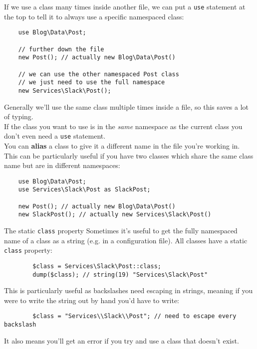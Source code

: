 \pagebreak

If we use a class many times inside another file, we can put a \texttt{use} statement at the top to tell it to always use a specific namespaced class:

\begin{verbatim}
    use Blog\Data\Post;

    // further down the file
    new Post(); // actually new Blog\Data\Post()

    // we can use the other namespaced Post class
    // we just need to use the full namespace
    new Services\Slack\Post();
\end{verbatim}

Generally we'll use the same class multiple times inside a file, so this saves a lot of typing.
\\

If the class you want to use is in the \textit{same} namespace as the current class you don't even need a \texttt{use} statement.
\\

You can \textbf{alias} a class to give it a different name in the file you're working in. This can be particularly useful if you have two classes which share the same class name but are in different namespaces:

\begin{verbatim}
    use Blog\Data\Post;
    use Services\Slack\Post as SlackPost;

    new Post(); // actually new Blog\Data\Post()
    new SlackPost(); // actually new Services\Slack\Post()
\end{verbatim}


\pagebreak

\begin{infobox}{The static \texttt{class} property}
    Sometimes it's useful to get the fully namespaced name of a class as a string (e.g. in a configuration file). All classes have a static \texttt{class} property:

    \begin{verbatim}
        $class = Services\Slack\Post::class;
        dump($class); // string(19) "Services\Slack\Post"
    \end{verbatim}

    This is particularly useful as backslashes need escaping in strings, meaning if you were to write the string out by hand you'd have to write:

    \begin{verbatim}
        $class = "Services\\Slack\\Post"; // need to escape every backslash
    \end{verbatim}

    It also means you'll get an error if you try and use a class that doesn't exist.
\end{infobox}




